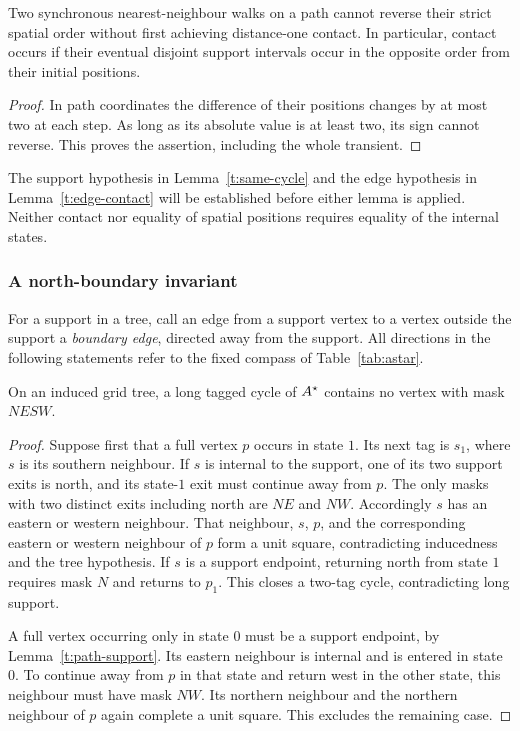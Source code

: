 \begin{lemma}\label{t:order-inversion}
Two synchronous nearest-neighbour walks on a path cannot reverse their
strict spatial order without first achieving distance-one contact.
In particular, contact occurs if their eventual disjoint support intervals
occur in the opposite order from their initial positions.
\end{lemma}
\begin{proof}
In path coordinates the difference of their positions changes by at most
two at each step. As long as its absolute value is at least two, its sign
cannot reverse. This proves the assertion, including the whole transient.
\end{proof}

The support hypothesis in Lemma~\ref{t:same-cycle} and the edge hypothesis
in Lemma~\ref{t:edge-contact} will be established before either lemma is
applied. Neither contact nor equality of spatial positions requires equality
of the internal states.

\subsubsection{A north-boundary invariant}

For a support in a tree, call an edge from a support vertex to a vertex
outside the support a \emph{boundary edge}, directed away from the support.
All directions in the following statements refer to the fixed compass of
Table~\ref{tab:astar}.

\begin{lemma}\label{t:no-full}
On an induced grid tree, a long tagged cycle of \(A^{\star}\) contains no
vertex with mask \(NESW\).
\end{lemma}
\begin{proof}
Suppose first that a full vertex \(p\) occurs in state \(1\).
Its next tag is \(s_1\), where \(s\) is its southern neighbour.
If \(s\) is internal to the support, one of its two support exits is north,
and its state-\(1\) exit must continue away from \(p\). The only masks
with two distinct exits including north are \(NE\) and \(NW\).
Accordingly \(s\) has an eastern or western neighbour. That neighbour,
\(s\), \(p\), and the corresponding eastern or western neighbour of \(p\)
form a unit square, contradicting inducedness and the tree hypothesis.
If \(s\) is a support endpoint, returning north from state \(1\) requires
mask \(N\) and returns to \(p_1\). This closes a two-tag cycle, contradicting
long support.

A full vertex occurring only in state \(0\) must be a support endpoint,
by Lemma~\ref{t:path-support}. Its eastern neighbour is internal and is
entered in state \(0\). To continue away from \(p\) in that state and
return west in the other state, this neighbour must have mask \(NW\).
Its northern neighbour and the northern neighbour of \(p\) again complete
a unit square. This excludes the remaining case.
\end{proof}

